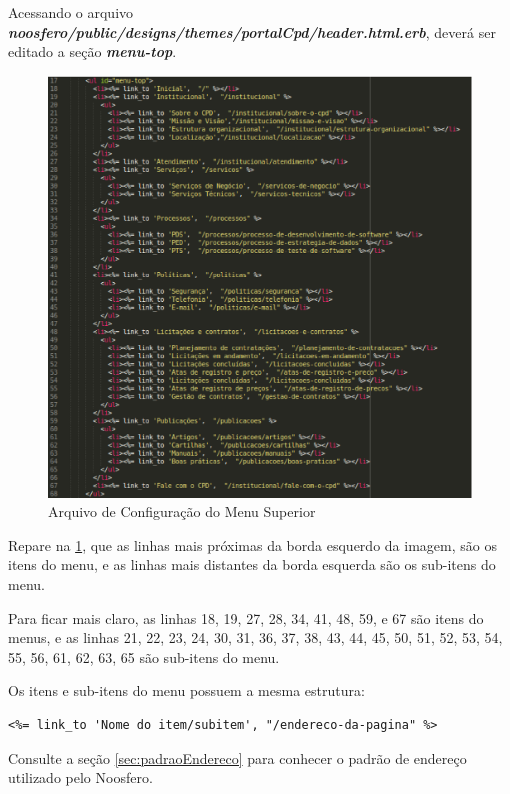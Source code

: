 Acessando o arquivo \emph{\textbf{noosfero/public/designs/themes/portalCpd/header.html.erb}},
deverá ser editado a seção \emph {\textbf{menu-top}}.

\begin{figure}[h]
     \centering
       \includegraphics[scale=0.5]{figuras/menu-top}
     \caption{Arquivo de Configuração do Menu Superior}
     \label{fig:configMenuSuperior}
\end{figure}

Repare na \ref{fig:configMenuSuperior}, que as linhas mais próximas da borda esquerdo da imagem, são os itens do menu, e as linhas mais distantes da borda esquerda são os sub-itens do menu.

Para ficar mais claro, as linhas 18, 19, 27, 28, 34, 41, 48, 59, e 67 são itens do menus, e as linhas 21, 22, 23, 24, 30, 31, 36, 37, 38, 43, 44, 45, 50, 51, 52, 53, 54, 55, 56, 61, 62, 63, 65 são sub-itens do menu.

Os itens e sub-itens do menu possuem a mesma estrutura:

\begin{verbatim}
<%= link_to 'Nome do item/subitem', "/endereco-da-pagina" %>
\end{verbatim}

Consulte a seção \ref{sec:padraoEndereco} para conhecer o padrão de endereço utilizado pelo Noosfero.


